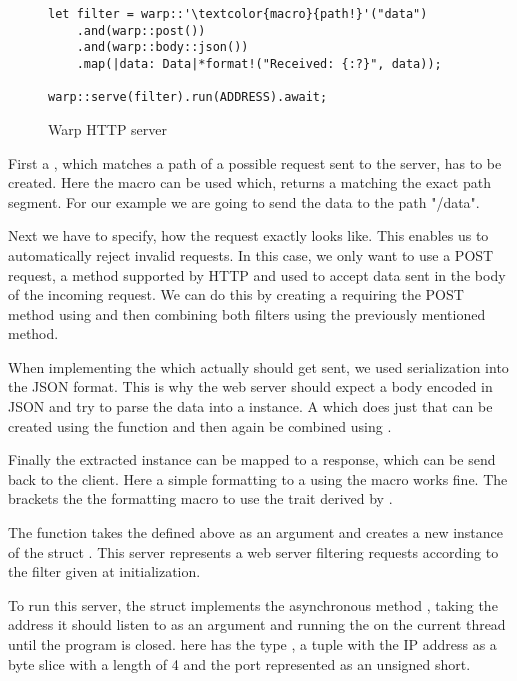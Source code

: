 \begin{figure}[ht]
    \begin{verbatim}
let filter = warp::'\textcolor{macro}{path!}'("data")
    .and(warp::post())
    .and(warp::body::json())
    .map(|data: Data|*format!("Received: {:?}", data));

warp::serve(filter).run(ADDRESS).await;
    \end{verbatim}
    \caption{Warp HTTP server}
    \label{http-server}
\end{figure}

First a , which matches a path of a possible request sent to the server, has to be created. Here the macro
 can be used which, returns a  matching the exact path segment. For our example
we are going to send the data to the path "/data".

Next we have to specify, how the request exactly looks like. This enables us to automatically reject invalid requests.
In this case, we only want to use a POST request, a method supported by HTTP and used to accept data sent in the body
of the incoming request. We can do this by creating a  requiring the POST method using 
and then combining both filters using the previously mentioned  method.

When implementing the  which actually should get sent, we used serialization into the JSON format. This is
why the web server should expect a body encoded in JSON and try to parse the data into a  instance. A
 which does just that can be created using the function  and then again be
combined using .

Finally the extracted  instance can be mapped to a response, which can be send back to the client. Here a
simple formatting to a  using the  macro works fine. The  brackets the the
formatting macro to use the  trait derived by .

The function  takes the  defined above as an argument and creates a new instance of the
struct . This server represents a web server filtering requests according to the filter given at
initialization.

To run this server, the struct implements the asynchronous method , taking the address it should listen to
as an argument and running the  on the current thread until the program is closed.  here has
the type , a tuple with the IP address as a byte slice with a length of 4 and the port represented
as an unsigned short.

